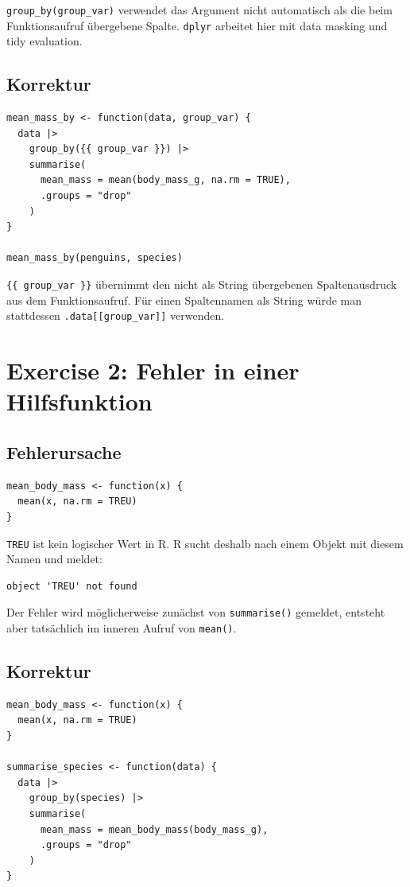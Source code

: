 \documentclass[11pt,a4paper]{ctexart}
\begin{document}
\lstinline|group_by(group_var)| verwendet das Argument nicht automatisch als
die beim Funktionsaufruf übergebene Spalte. \texttt{dplyr} arbeitet hier mit
data masking und tidy evaluation.

\subsection{Korrektur}

\begin{lstlisting}[style=rcode]
mean_mass_by <- function(data, group_var) {
  data |>
    group_by({{ group_var }}) |>
    summarise(
      mean_mass = mean(body_mass_g, na.rm = TRUE),
      .groups = "drop"
    )
}

mean_mass_by(penguins, species)
\end{lstlisting}

\lstinline|{{ group_var }}| übernimmt den nicht als String übergebenen
Spaltenausdruck aus dem Funktionsaufruf. Für einen Spaltennamen als String
würde man stattdessen \lstinline|.data[[group_var]]| verwenden.

\section{Exercise 2: Fehler in einer Hilfsfunktion}

\subsection{Fehlerursache}

\begin{lstlisting}[style=rcode]
mean_body_mass <- function(x) {
  mean(x, na.rm = TREU)
}
\end{lstlisting}

\lstinline|TREU| ist kein logischer Wert in R. R sucht deshalb nach einem
Objekt mit diesem Namen und meldet:

\begin{lstlisting}[style=textcode]
object 'TREU' not found
\end{lstlisting}

Der Fehler wird möglicherweise zunächst von \lstinline|summarise()| gemeldet,
entsteht aber tatsächlich im inneren Aufruf von \lstinline|mean()|.

\subsection{Korrektur}

\begin{lstlisting}[style=rcode]
mean_body_mass <- function(x) {
  mean(x, na.rm = TRUE)
}

summarise_species <- function(data) {
  data |>
    group_by(species) |>
    summarise(
      mean_mass = mean_body_mass(body_mass_g),
      .groups = "drop"
    )
}
\end{lstlisting}
\end{document}
